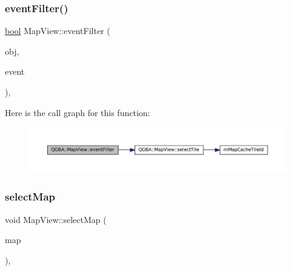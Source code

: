 \subsubsection{\texorpdfstring{event\+Filter()}{eventFilter()}}
{\footnotesize\ttfamily \mbox{\hyperlink{libretro_8h_a4a26dcae73fb7e1528214a068aca317e}{bool}} Map\+View\+::event\+Filter (\begin{DoxyParamCaption}\item[{Q\+Object $\ast$}]{obj,  }\item[{Q\+Event $\ast$}]{event }\end{DoxyParamCaption})\hspace{0.3cm}{\ttfamily [override]}, {\ttfamily [protected]}}

Here is the call graph for this function\+:
\nopagebreak
\begin{figure}[H]
\begin{center}
\leavevmode
\includegraphics[width=350pt]{class_q_g_b_a_1_1_map_view_a6292ffd1dfcd0160d05d3872fcb3b04b_cgraph}
\end{center}
\end{figure}
\mbox{\label{class_q_g_b_a_1_1_map_view_ad51a1de9d54f8ef9203ac28706cf3727}} 
\subsubsection{\texorpdfstring{select\+Map}{selectMap}}
{\footnotesize\ttfamily void Map\+View\+::select\+Map (\begin{DoxyParamCaption}\item[{\mbox{\hyperlink{ioapi_8h_a787fa3cf048117ba7123753c1e74fcd6}{int}}}]{map }\end{DoxyParamCaption})\hspace{0.3cm}{\ttfamily [private]}, {\ttfamily [slot]}}


